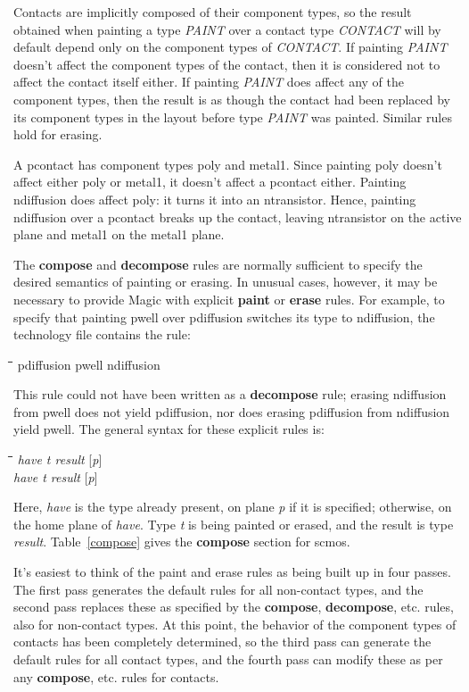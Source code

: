 \documentclass[letterpaper,twoside,12pt]{article}
\def\hinch{\hspace*{0.5in}}
\def\starti{\begin{center}\begin{tabbing}\hinch\=\hinch\=\hinch\=\hinch\=\kill}
\def\endi{\end{tabbing}\end{center}}
\def\ii{\>\>\>}
\begin{document}
Contacts are implicitly composed of their component types,
so the result obtained when painting a type {\itshape PAINT} over a contact
type {\itshape CONTACT} will by default depend only on
the component types of {\itshape CONTACT}.
If painting {\itshape PAINT} doesn't affect the component
types of the contact, then it is considered not to affect the
contact itself either.  If painting {\itshape PAINT} does affect any of
the component types, then the result is as though the contact
had been replaced by its component types in the layout before type
{\itshape PAINT} was painted.  Similar rules hold for erasing.

A pcontact has component types poly and metal1.
Since painting poly doesn't affect either poly or metal1, it
doesn't affect a pcontact either.
Painting ndiffusion does affect
poly: it turns it into an ntransistor.
Hence, painting ndiffusion over a pcontact breaks up
the contact, leaving ntransistor on the
active plane and metal1 on the metal1 plane.

The {\bfseries compose} and {\bfseries decompose} rules
are normally sufficient to specify the desired semantics
of painting or erasing.
In unusual cases, however, it may be necessary to provide
Magic with explicit {\bfseries paint} or {\bfseries erase} rules.
For example,
to specify that painting pwell over pdiffusion switches its
type to ndiffusion, the technology file contains the
rule:

\starti
   \ii {\bfseries paint} pdiffusion pwell ndiffusion
\endi

This rule could not have been written as a {\bfseries decompose} rule;
erasing ndiffusion from pwell does not yield pdiffusion,
nor does erasing pdiffusion from ndiffusion yield pwell.
The general syntax for these explicit rules is:

\starti
   \ii {\bfseries paint} {\itshape have t result }[{\itshape p}] \\
   \ii {\bfseries erase} {\itshape have t result }[{\itshape p}]
\endi

Here, {\itshape have} is the type already present, on plane {\itshape p}
if it is specified; otherwise, on the home plane of {\itshape have}.
Type {\itshape t} is being painted or erased, and the result is type {\itshape result}.
Table~\ref{compose} gives the {\bfseries compose} section for scmos.

It's easiest to think of the paint and erase rules as being built
up in four passes.
The first pass generates the default rules for all non-contact types,
and the second pass replaces these as specified by the {\bfseries compose},
{\bfseries decompose}, etc. rules, also for non-contact types.
At this point, the behavior of the component types of contacts has
been completely determined, so the third pass can generate the
default rules for all contact types, and the fourth pass
can modify these as per any {\bfseries compose}, etc. rules for contacts.
\end{document}

